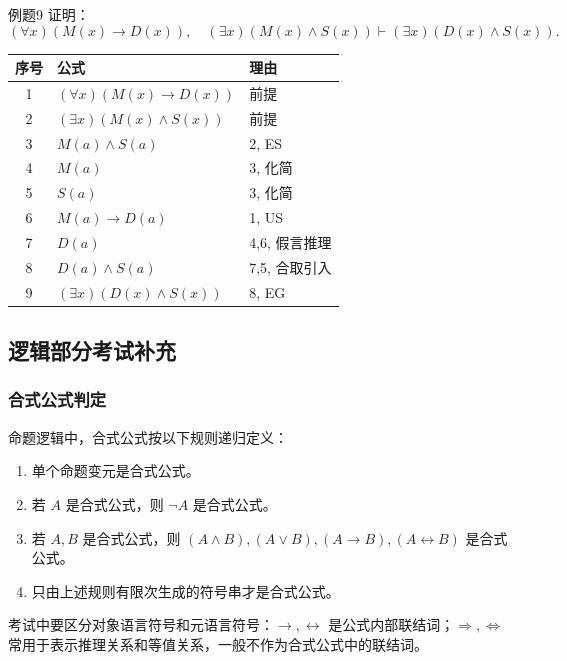 \begin{question}{例题9}
	证明：
	\[
	(\forall x)(M(x)\to D(x)),\quad(\exists x)(M(x)\land S(x))\vdash(\exists x)(D(x)\land S(x)).
	\]
	
	\begin{solution}
	\begin{center}
	\begin{tabular}{cll}
		\toprule
		序号 & 公式 & 理由\\
		\midrule
		1&\((\forall x)(M(x)\to D(x))\)&前提\\
		2&\((\exists x)(M(x)\land S(x))\)&前提\\
		3&\(M(a)\land S(a)\)&2, ES\\
		4&\(M(a)\)&3, 化简\\
		5&\(S(a)\)&3, 化简\\
		6&\(M(a)\to D(a)\)&1, US\\
		7&\(D(a)\)&4,6, 假言推理\\
		8&\(D(a)\land S(a)\)&7,5, 合取引入\\
		9&\((\exists x)(D(x)\land S(x))\)&8, EG\\
		\bottomrule
	\end{tabular}
	\end{center}
	\end{solution}
\end{question}

\subsection{逻辑部分考试补充}

\subsubsection{合式公式判定}

命题逻辑中，合式公式按以下规则递归定义：
\begin{enumerate}
	\item 单个命题变元是合式公式。
	\item 若 \(A\) 是合式公式，则 \(\neg A\) 是合式公式。
	\item 若 \(A,B\) 是合式公式，则 \((A\land B),(A\lor B),(A\to B),(A\leftrightarrow B)\) 是合式公式。
	\item 只由上述规则有限次生成的符号串才是合式公式。
\end{enumerate}

考试中要区分对象语言符号和元语言符号：\(\to,\leftrightarrow\) 是公式内部联结词；\(\Rightarrow,\Leftrightarrow\) 常用于表示推理关系和等值关系，一般不作为合式公式中的联结词。

